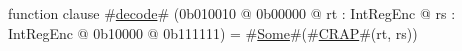function clause #\hyperref[sailMIPSzdecode]{decode}# (0b010010 @ 0b00000 @ rt : IntRegEnc @ rs : IntRegEnc @   0b10000 @ 0b111111) = #\hyperref[sailMIPSzSome]{Some}#(#\hyperref[sailMIPSzCRAP]{CRAP}#(rt, rs))
